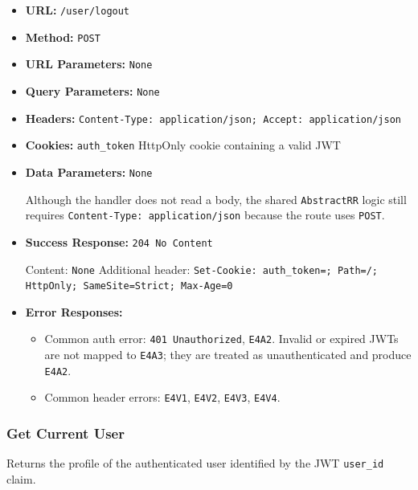 \begin{itemize}[nosep]
\item \textbf{URL:} \texttt{/user/logout}

\item \textbf{Method:} \texttt{POST}

\item \textbf{URL Parameters:} \texttt{None}

\item \textbf{Query Parameters:} \texttt{None}

\item \textbf{Headers:} \texttt{Content-Type: application/json; Accept: application/json}

\item \textbf{Cookies:} \texttt{auth\_token} HttpOnly cookie containing a valid JWT

\item \textbf{Data Parameters:} \texttt{None}

Although the handler does not read a body, the shared \texttt{AbstractRR} logic still requires \texttt{Content-Type: application/json} because the route uses \texttt{POST}.

\item \textbf{Success Response:} \texttt{204 No Content}

Content: \texttt{None} Additional header: \texttt{Set-Cookie: auth\_token=; Path=/; HttpOnly; SameSite=Strict; Max-Age=0}

\item \textbf{Error Responses:}

\begin{itemize}[nosep]
\item Common auth error: \texttt{401 Unauthorized}, \texttt{E4A2}. Invalid or expired JWTs are not mapped to \texttt{E4A3}; they are treated as unauthenticated and produce \texttt{E4A2}.
\item Common header errors: \texttt{E4V1}, \texttt{E4V2}, \texttt{E4V3}, \texttt{E4V4}.
\end{itemize}

\end{itemize}

\subsubsection*{Get Current User}

Returns the profile of the authenticated user identified by the JWT \texttt{user\_id} claim.

